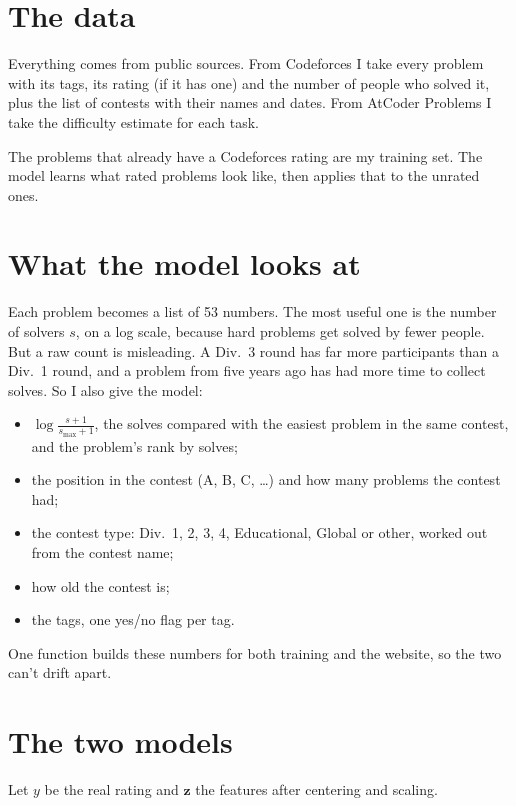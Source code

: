 \documentclass[11pt,a4paper]{article}
\begin{document}
\section{The data}

Everything comes from public sources. From Codeforces I take every problem with its tags, its rating (if it has one) and the number of people who solved it, plus the list of contests with their names and dates. From AtCoder Problems I take the difficulty estimate for each task.

The problems that already have a Codeforces rating are my training set. The model learns what rated problems look like, then applies that to the unrated ones.

\section{What the model looks at}

Each problem becomes a list of 53 numbers. The most useful one is the number of solvers $s$, on a log scale, because hard problems get solved by fewer people. But a raw count is misleading. A Div.~3 round has far more participants than a Div.~1 round, and a problem from five years ago has had more time to collect solves. So I also give the model:

\begin{itemize}[nosep]
\item $\log\frac{s+1}{s_{\max}+1}$, the solves compared with the easiest problem in the same contest, and the problem's rank by solves;
\item the position in the contest (A, B, C, \dots) and how many problems the contest had;
\item the contest type: Div.~1, 2, 3, 4, Educational, Global or other, worked out from the contest name;
\item how old the contest is;
\item the tags, one yes/no flag per tag.
\end{itemize}

One function builds these numbers for both training and the website, so the two can't drift apart.

\section{The two models}

Let $y$ be the real rating and $\mathbf{z}$ the features after centering and scaling.
\end{document}
